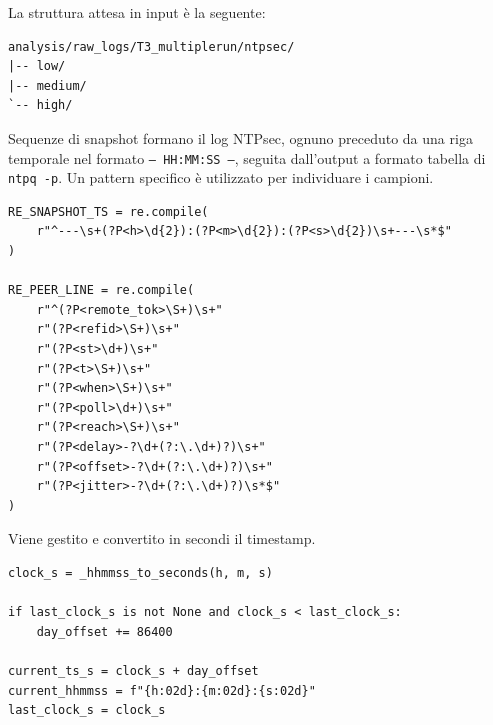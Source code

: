 La struttura attesa in input è la seguente:

\begin{listing}[H]
\begin{verbatim}
analysis/raw_logs/T3_multiplerun/ntpsec/
|-- low/
|-- medium/
`-- high/
\end{verbatim}
\caption{Struttura di input utilizzata dal parser NTPsec.}
\label{lst:ntpsec-input-structure}
\end{listing}

Sequenze di snapshot formano il log NTPsec, ognuno preceduto da una riga temporale 
nel formato \texttt{--- HH:MM:SS ---}, seguita dall'output a formato tabella di \texttt{ntpq -p}.
Un pattern specifico è utilizzato per individuare i campioni.

\begin{listing}[H]
\begin{verbatim}
RE_SNAPSHOT_TS = re.compile(
    r"^---\s+(?P<h>\d{2}):(?P<m>\d{2}):(?P<s>\d{2})\s+---\s*$"
)

RE_PEER_LINE = re.compile(
    r"^(?P<remote_tok>\S+)\s+"
    r"(?P<refid>\S+)\s+"
    r"(?P<st>\d+)\s+"
    r"(?P<t>\S+)\s+"
    r"(?P<when>\S+)\s+"
    r"(?P<poll>\d+)\s+"
    r"(?P<reach>\S+)\s+"
    r"(?P<delay>-?\d+(?:\.\d+)?)\s+"
    r"(?P<offset>-?\d+(?:\.\d+)?)\s+"
    r"(?P<jitter>-?\d+(?:\.\d+)?)\s*$"
)
\end{verbatim}
\caption{Pattern utilizzati per riconoscere timestamp e righe peer di \texttt{ntpq -p}.}
\label{lst:ntpsec-regex}
\end{listing}

Viene gestito e convertito in secondi il timestamp.

\begin{listing}[H]
\begin{verbatim}
clock_s = _hhmmss_to_seconds(h, m, s)

if last_clock_s is not None and clock_s < last_clock_s:
    day_offset += 86400

current_ts_s = clock_s + day_offset
current_hhmmss = f"{h:02d}:{m:02d}:{s:02d}"
last_clock_s = clock_s
\end{verbatim}
\caption{Gestione della sequenza temporale negli snapshot NTPsec.}
\label{lst:ntpsec-time-handling}
\end{listing}

